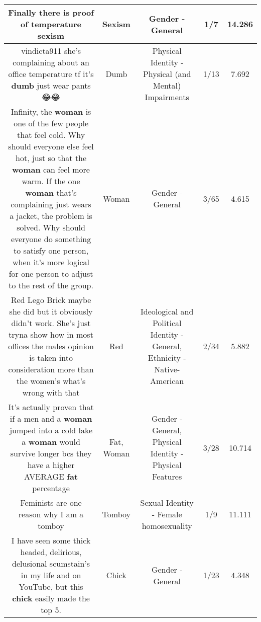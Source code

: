 \documentclass[11pt]{article}
\newlength\mylength
\begin{document}
\begin{center}
\begin{longtable}{|C{.65\mylength}|C{.30\mylength}|C{.12\mylength}|C{.12\mylength}|C{.12\mylength}|}
  \small Finally there is proof of temperature sexism\normalsize   & Sexism & Gender - General & 1/7 & 14.286 \\  \hline
  \small vindicta911 she's complaining about an office temperature tf it's \textbf{dumb}  just wear pants😂😂\normalsize   & Dumb & Physical Identity - Physical (and Mental) Impairments & 1/13 & 7.692 \\  \hline
  \small Infinity, the \textbf{woman} is one of the few people that feel cold. Why should everyone else feel hot, just so that the \textbf{woman} can feel more warm. If the one \textbf{woman} that's complaining just wears a jacket, the problem is solved. Why should everyone do something to satisfy one person, when it's more logical for one person to adjust to the rest of the group.\normalsize   & Woman & Gender - General & 3/65 & 4.615 \\  \hline
  \small Red Lego Brick maybe she did but it obviously didn't work. She's just tryna show how in most offices the males opinion is taken into consideration more than the women's what's wrong with that\normalsize   & Red &  Ideological and Political Identity - General, Ethnicity - Native-American & 2/34 & 5.882 \\  \hline
  \small It's actually proven that if a men and a \textbf{woman} jumped into a cold lake a \textbf{woman} would survive longer bcs they have a higher AVERAGE \textbf{fat} percentage\normalsize   & Fat, Woman & Gender - General, Physical Identity - Physical Features & 3/28 & 10.714 \\  \hline
  \small Feminists are one reason why I am a tomboy\normalsize   & Tomboy & Sexual Identity - Female homosexuality & 1/9 & 11.111 \\  \hline
  \small I have seen some thick headed, delirious, delusional scumstain's in my life and on YouTube, but this \textbf{chick} easily made the top 5.\normalsize   & Chick & Gender - General & 1/23 & 4.348 \\  \hline

\end{longtable}
\end{center}
\end{document}
